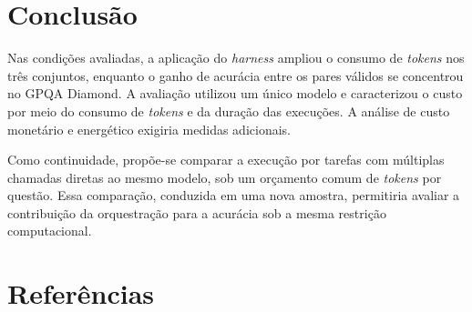 \documentclass[a4paper,10pt, twocolumn]{article}
\begin{document}
\section{Conclusão}

Nas condições avaliadas, a aplicação do \textit{harness} ampliou o consumo de \textit{tokens} nos três conjuntos, enquanto o ganho de acurácia entre os pares válidos se concentrou no GPQA Diamond. A avaliação utilizou um único modelo e caracterizou o custo por meio do consumo de \textit{tokens} e da duração das execuções. A análise de custo monetário e energético exigiria medidas adicionais.

Como continuidade, propõe-se comparar a execução por tarefas com múltiplas chamadas diretas ao mesmo modelo, sob um orçamento comum de \textit{tokens} por questão. Essa comparação, conduzida em uma nova amostra, permitiria avaliar a contribuição da orquestração para a acurácia sob a mesma restrição computacional.

\section{Referências}
\printbibliography[heading=none]
\end{document}
